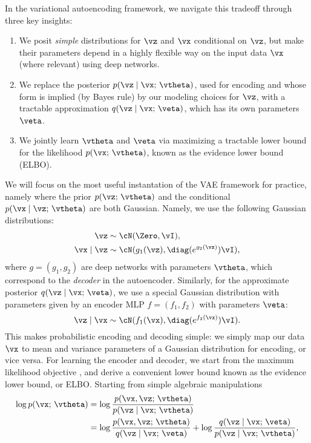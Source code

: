 \documentclass[../../book-main.tex]{subfiles}
\begin{document}
In the variational autoencoding framework, we navigate this tradeoff through
three key insights:
\begin{enumerate}
\item We posit \textit{simple} distributions for $\vz$ and $\vx$ conditional
  on $\vz$, but make their parameters depend in a highly flexible way on the
  input data $\vx$ (where relevant) using deep networks.
\item We replace the posterior $p(\vz \mid \vx;\, \vtheta)$, used for encoding
  and whose form is implied (by Bayes rule) by our modeling choices for $\vz$,
  with a tractable approximation $q(\vz \mid \vx;\, \veta)$, which has its own
  parameters $\veta$.
\item We jointly learn $\vtheta$ and $\veta$ via maximizing a tractable lower
  bound for the likelihood $p(\vx ;\, \vtheta)$, known as the evidence lower
  bound (ELBO).
\end{enumerate}
We will focus on the most useful instantation of the VAE framework
for practice, namely
where the prior $p(\vz ;\, \vtheta)$ and the conditional $p(\vx \mid \vz;\,
\vtheta)$ are both Gaussian. Namely, we use the following Gaussian
distributions:
\begin{align*}
\vz &\sim \cN(\Zero, \vI), \\
\vx \mid \vz &\sim \cN(g_1(\vz), \diag(e^{g_2(\vz)}) \vI),
\end{align*}
where $g = (g_1, g_2)$ are deep networks with parameters $\vtheta$, which
correspond to the \textit{decoder} in the autoencoder.
Similarly, for the approximate posterior $q(\vz \mid \vx;\, \veta)$, we use
a special Gaussian distribution with parameters given by an encoder
MLP $f = (f_1, f_2)$ with parameters $\veta$:
\begin{equation*}
\vz \mid \vx \sim \cN(f_1(\vx), \diag(e^{f_2(\vx)}) \vI).
\end{equation*}
This makes probabilistic encoding and decoding simple: we simply map our data
$\vx$ to mean and variance parameters of a Gaussian distribution for
encoding, or vice versa.
For learning the encoder and decoder, we start from the maximum likelihood
objective , and derive a convenient lower bound known as the
evidence lower bound, or ELBO. Starting from simple algebraic manipulations
\begin{align*}
\log p(\vx;\, \vtheta) &=
\log \frac{p(\vx, \vz;\, \vtheta)}{p(\vz \mid \vx;\, \vtheta)}
\\
&=
\log \frac{p(\vx, \vz;\, \vtheta)}{q(\vz \mid \vx;\, \veta)}
+
\log \frac{q(\vz \mid \vx;\, \veta)}{p(\vz \mid \vx;\, \vtheta)},
\end{align*}
\end{document}

